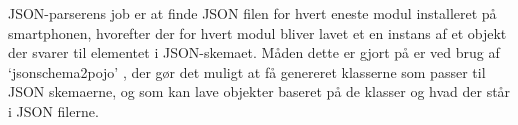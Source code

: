 JSON-parserens job er at finde JSON filen for hvert eneste modul installeret på smartphonen, hvorefter der for hvert modul bliver lavet et en instans af et objekt der svarer til  elementet i JSON-skemaet.
Måden dette er gjort på er ved brug af `jsonschema2pojo' \citep{jsonpojo}, der gør det muligt at få genereret klasserne som passer til JSON skemaerne, og som kan lave objekter baseret på de klasser og hvad der står i JSON filerne. 